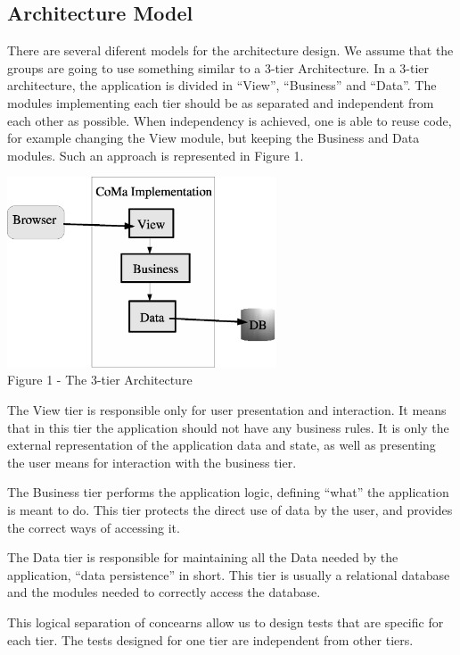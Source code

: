 \documentclass[11pt]{article}
\begin{document}
\subsection{Architecture Model}

\indent

There are several diferent models for the architecture design. We assume that the groups are going to use something similar to a 3-tier Architecture. In a 3-tier architecture, the application is divided in ``View'', ``Business'' and ``Data''. The modules implementing each tier should be as separated and independent from each other as possible. When independency is achieved, one is able to reuse code, for example changing the View module, but keeping the Business and Data modules. Such an approach is represented in Figure 1.

\begin{center}
\includegraphics[width=8cm]{3tier.eps} \\
Figure 1 - The 3-tier Architecture
\end{center}

The View tier is responsible only for user presentation and interaction. It means that in this tier the application should not have any business rules. It is only the external representation of the application data and state, as well as presenting the user means for interaction with the business tier.

The Business tier performs the application logic, defining ``what'' the application is meant to do. This tier protects the direct use of data by the user, and provides the correct ways of accessing it.

The Data tier is responsible for maintaining all the Data needed by the application, ``data persistence'' in short. This tier is usually a relational database and the modules needed to correctly access the database.

This logical separation of concearns allow us to design tests that are specific for each tier. The tests designed for one tier are independent from other tiers.
\end{document}
